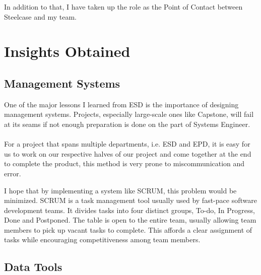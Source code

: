 \documentclass[a4paper, fleqn]{article}
\begin{document}
In addition to that, I have taken up the role as the Point of Contact between Steelcase and my team.

\section{Insights Obtained}

\subsection{Management Systems}

One of the major lessons I learned from ESD is the importance of designing management systems. Projects, especially large-scale ones like Capstone, will fail at its seams if not enough preparation is done on the part of Systems Engineer.\\
\\
For a project that spans multiple departments, i.e. ESD and EPD, it is easy for us to work on our respective halves of our project and come together at the end to complete the product, this method is very prone to miscommunication and error.

\pagebreak

I hope that by implementing a system like SCRUM, this problem would be minimized. SCRUM is a task management tool usually used by fast-pace software development teams. It divides tasks into four distinct groups, To-do, In Progress, Done and Postponed. The table is open to the entire team, usually allowing team members to pick up vacant tasks to complete. This affords a clear assignment of tasks while encouraging competitiveness among team members.

\subsection{Data Tools}
\end{document}
